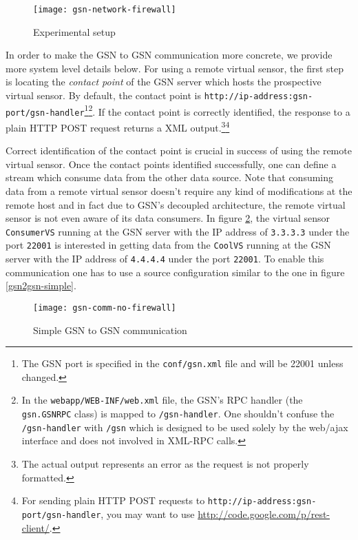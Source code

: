 \begin{figure}%
  \centering
  \texttt{[image: gsn-network-firewall]}
  \caption{Experimental setup}
  \label{fig:gsn-network-firewall}
\end{figure}

In order to make the GSN to GSN communication more concrete, we provide more system level details below.
For using a remote virtual sensor, the first step is locating the \emph{contact point} of the GSN server which
hosts the prospective virtual sensor. By default, the contact point is \texttt{http://ip-address:gsn-port/gsn-handler}\footnote{The GSN port is specified in the \texttt{conf/gsn.xml} file and will be 22001 unless changed.}\footnote{In the \texttt{webapp/WEB-INF/web.xml} file, the GSN's RPC handler (the \texttt{gsn.GSNRPC} class) is mapped to \texttt{/gsn-handler}. One shouldn't confuse the \texttt{/gsn-handler} with \texttt{/gsn} which is designed to be used solely by the web/ajax interface and does not involved in XML-RPC calls.}.
If  the contact point is correctly identified, the response to a plain HTTP POST request 
returns a XML output.\footnote{The actual output represents an error as the request is not properly formatted.}\footnote{For sending plain HTTP POST requests
to \texttt{http://ip-address:gsn-port/gsn-handler}, you may want to use \url{http://code.google.com/p/rest-client/}. }

Correct identification of the contact point is crucial in success of using the remote virtual sensor.
Once the contact points identified successfully, one can define a stream which consume data from the other data source.
Note that consuming data from a remote virtual sensor doesn't require any kind of modifications at the remote host and in fact 
due to GSN's decoupled architecture, the remote virtual sensor is not even aware of its data consumers. In figure \ref{gsn2gsn-simple-figure},
the virtual sensor \texttt{ConsumerVS} running at the GSN server with the IP address of \texttt{3.3.3.3} under the port \texttt{22001} is interested
in getting data from the \texttt{CoolVS} running at the GSN server with the IP address of \texttt{4.4.4.4} under the port \texttt{22001}. To enable this
communication one has to use a source configuration similar to the one in figure \ref{gsn2gsn-simple}.


\begin{figure}%
  \centering
  \texttt{[image: gsn-comm-no-firewall]}
  \caption{Simple GSN to GSN communication}
  \label{gsn2gsn-simple-figure}
\end{figure}



